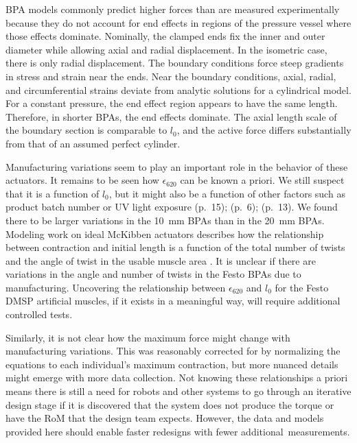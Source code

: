 BPA models commonly predict higher forces than are measured experimentally because they do not account for end effects in regions of the pressure vessel where those effects dominate.	Nominally, the clamped ends fix the inner and outer diameter while allowing axial and radial displacement. In the isometric case, there is only radial displacement. The boundary conditions force steep gradients in stress and strain near the ends. Near the boundary conditions, axial, radial, and circumferential strains deviate from analytic solutions for a cylindrical model. For a constant pressure, the end effect region appears to have the same length. Therefore, in shorter BPAs, the end effects dominate. The axial length scale of the boundary section is comparable to $l_0$,  and the active force differs substantially from that of an assumed perfect cylinder.

Manufacturing variations seem to play an important role in the behavior of these actuators. It remains to be seen how $\epsilon_{620}$ can be known a priori. We still suspect that it is a function of $l_0$, but it might also be a function of other factors such as product batch number or UV light exposure \citep{festo_2026} (p.~15); \citep{festo_2018} (p.~6); \citep{festo_2013} (p.~13). We found there to be larger variations in the \qty{10}{\mm} BPAs than in the \qty{20}{\mm} BPAs. Modeling work on ideal McKibben actuators describes how the relationship between contraction and initial length is a function of the total number of twists and the angle of twist in the usable muscle area \citep{chou_measurement_1996}. It is unclear if there are variations in the angle and number of twists in the Festo BPAs due to manufacturing. Uncovering the relationship between $\epsilon_{620}$ and $l_0$ for the Festo DMSP artificial muscles, if it exists in a meaningful way, will require additional controlled tests. 

Similarly, it is not clear how the maximum force might change with manufacturing variations. This was reasonably corrected for by normalizing the equations to each individual's maximum contraction, but more nuanced details might emerge with more data collection. Not knowing these relationships a priori means there is still a need for robots and other systems to go through an iterative design stage if it is discovered that the system does not produce the torque or have the RoM that the design team expects. However, the data and models provided here should enable faster redesigns with fewer \mbox{additional measurements.}

